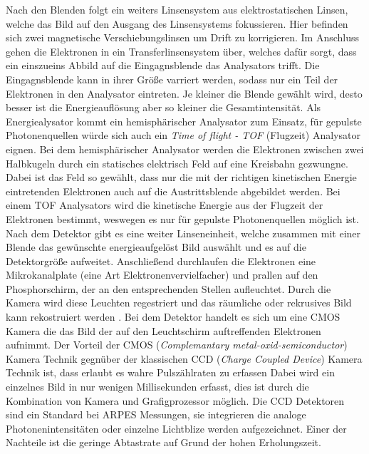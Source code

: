         Nach den Blenden folgt ein weiters Linsensystem aus elektrostatischen Linsen, welche das Bild auf den Ausgang des Linsensystems fokussieren.
        Hier befinden sich zwei magnetische Verschiebungslinsen um Drift zu korrigieren.
        Im Anschluss gehen die Elektronen in ein Transferlinsensystem über, welches dafür sorgt, dass ein einszueins Abbild auf die Eingagnsblende das Analysators trifft.
        Die Eingagnsblende kann in ihrer Größe varriert werden, sodass nur ein Teil der Elektronen in den Analysator eintreten.
        Je kleiner die Blende gewählt wird, desto besser ist die Energieauflösung aber so kleiner die Gesamtintensität.
        Als Energiealysator kommt ein hemisphärischer Analysator zum Einsatz, für gepulste Photonenquellen würde sich auch ein \textit{Time of flight - TOF} (Flugzeit) Analysator eignen.
        Bei dem hemisphärischer Analysator werden die Elektronen zwischen zwei Halbkugeln durch ein statisches elektrisch Feld auf eine Kreisbahn gezwungne.
        Dabei ist das Feld so gewählt, dass nur die mit der richtigen kinetischen Energie eintretenden Elektronen auch auf die Austrittsblende abgebildet werden.
        Bei einem TOF Analysators wird die kinetische Energie aus der Flugzeit der Elektronen bestimmt, weswegen es nur für gepulste Photonenquellen möglich ist.
        Nach dem Detektor gibt es eine weiter Linseneinheit, welche zusammen mit einer Blende das gewünschte energieaufgelöst Bild auswählt und es auf die Detektorgröße aufweitet.
        Anschließend durchlaufen die Elektronen eine Mikrokanalplate (eine Art Elektronenvervielfacher) und prallen auf den Phosphorschirm, der an den entsprechenden Stellen aufleuchtet.
        Durch die Kamera wird diese Leuchten regestriert und das räumliche oder rekrusives Bild kann rekostruiert werden \cite{SPECS-MM}.
        Bei dem Detektor handelt es sich um eine CMOS Kamera die das Bild der auf den Leuchtschirm auftreffenden Elektronen aufnimmt.
        Der Vorteil der CMOS (\textit{Complemantary metal-oxid-semiconductor}) Kamera Technik gegnüber der klassischen CCD (\textit{Charge Coupled Device}) Kamera Technik ist, dass erlaubt es wahre Pulszählraten zu erfassen 
        Dabei wird ein einzelnes Bild in nur wenigen Millisekunden erfasst, dies ist durch die Kombination von Kamera und Grafigprozessor möglich.
        Die CCD Detektoren sind ein Standard bei ARPES Messungen, sie integrieren die analoge Photonenintensitäten oder einzelne Lichtblize werden aufgezeichnet.
        Einer der Nachteile ist die geringe Abtastrate auf Grund der hohen Erholungszeit\cite{CMOS}.

